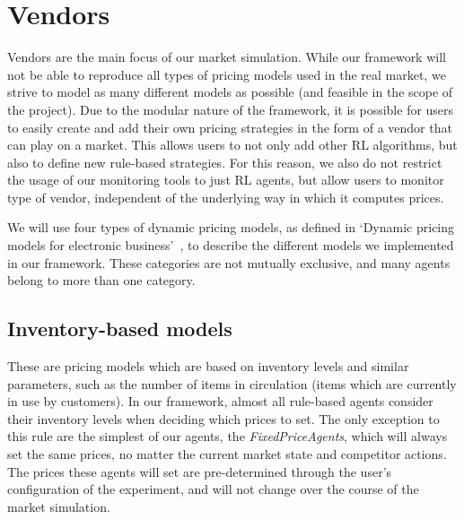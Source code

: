 \clearpage
\section{Vendors}\label{sec:ExplainVendors}

Vendors are the main focus of our market simulation. While our framework will not be able to reproduce all types of pricing models used in the real market, we strive to model as many different models as possible (and feasible in the scope of the project). Due to the modular nature of the framework, it is possible for users to easily create and add their own pricing strategies in the form of a vendor that can play on a market. This allows users to not only add other RL algorithms, but also to define new rule-based strategies. For this reason, we also do not restrict the usage of our monitoring tools to just RL agents, but allow users to monitor type of vendor, independent of the underlying way in which it computes prices.

We will use four types of dynamic pricing models, as defined in `Dynamic pricing models for electronic business'~\cite{dynamicPricingModels}, to describe the different models we implemented in our framework. These categories are not mutually exclusive, and many agents belong to more than one category.

\subsection{Inventory-based models}\label{subsec:InventoryBasedModels}

These are pricing models which are based on inventory levels and similar parameters, such as the number of items in circulation (items which are currently in use by customers). In our framework, almost all rule-based agents consider their inventory levels when deciding which prices to set. The only exception to this rule are the simplest of our agents, the \emph{FixedPriceAgents}, which will always set the same prices, no matter the current market state and competitor actions. The prices these agents will set are pre-determined through the user's configuration of the experiment, and will not change over the course of the market simulation.

